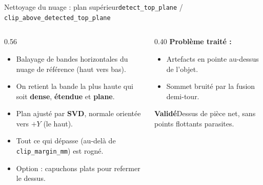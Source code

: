 \documentclass[aspectratio=169,10pt]{beamer}
\newcommand{\validbox}[1]{%
  \begin{beamercolorbox}[wd=\linewidth,sep=0.25cm,rounded=true]{}
    \colorbox{softgreen}{%
      \parbox{\dimexpr\linewidth-0.5cm\relax}{\textbf{\textcolor{deepblue}{Valid\'{e}}}\quad #1}%
    }
  \end{beamercolorbox}
}
\begin{document}
\begin{frame}{Nettoyage du nuage : plan sup\'{e}rieur}{\texttt{detect\_top\_plane} / \texttt{clip\_above\_detected\_top\_plane}}
  \begin{columns}[T,onlytextwidth]
    \begin{column}{0.56\textwidth}
      \footnotesize
      \begin{itemize}
        \item Balayage de bandes horizontales du nuage de r\'{e}f\'{e}rence (haut vers bas).
        \item On retient la bande la plus haute qui soit \textbf{dense}, \textbf{\'{e}tendue} et \textbf{plane}.
        \item Plan ajust\'{e} par \textbf{SVD}, normale orient\'{e}e vers $+Y$ (le haut).
        \item Tout ce qui d\'{e}passe (au-del\`{a} de \texttt{clip\_margin\_mm}) est rogn\'{e}.
        \item Option : capuchons plats pour refermer le dessus.
      \end{itemize}
    \end{column}
    \begin{column}{0.40\textwidth}
      \small
      \textbf{Probl\`{e}me trait\'{e} :}
      \begin{itemize}
        \item Artefacts \og en pointe \fg{} au-dessus de l'objet.
        \item Sommet bruit\'{e} par la fusion demi-tour.
      \end{itemize}
      \vspace{0.15cm}
      \validbox{Dessus de pi\`{e}ce net, sans points flottants parasites.}
    \end{column}
  \end{columns}
\end{frame}
\end{document}
